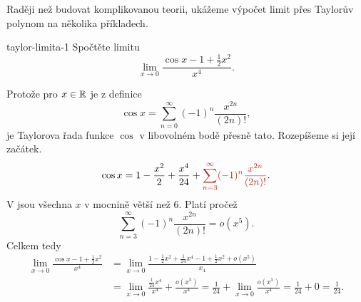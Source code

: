 Raději než budovat komplikovanou teorii, ukážeme výpočet limit přes Taylorův
polynom na několika příkladech.

\begin{problem}{}{taylor-limita-1}
 Spočtěte limitu
 \[
  \lim_{x \to 0} \frac{\cos x - 1 + \frac{1}{2}x^2}{x^{4}}.
 \]
\end{problem}
\begin{probsol}
 Protože pro $x \in \mathbb{R}$ je z definice
 \[
  \cos x = \sum_{n=0}^{\infty} (-1)^{n} \frac{x^{2n}}{(2n)!},
 \]
 je Taylorova řada funkce $\cos$ v libovolném bodě přesně tato. Rozepíšeme si
 její začátek.
 \[
  \cos x = 1 - \frac{x^2}{2} + \frac{x^{4}}{24} + \clr{\sum_{n=3}^{\infty}
  (-1)^{n}\frac{x^{2n}}{(2n)!}}.
 \]
 V  jsou všechna $x$ v mocnině větší než $6$. Platí pročež
 \[
  \sum_{n=3}^{\infty} (-1)^{n}\frac{x^{2n}}{(2n)!} = o(x^{5}).
 \]
 Celkem tedy
 \begin{align*}
  \lim_{x \to 0} \frac{\cos x - 1 + \frac{1}{2}x^2}{x^{4}} &= \lim_{x \to 0}
  \frac{1 - \frac{1}{2}x^2 + \frac{1}{24}x^{4} - 1 + \frac{1}{2}x^2 +
  o(x^{5})}{x_4}\\
                                                           &= \lim_{x \to 0}
                                                 \frac{\frac{1}{24}x^{4}}{x^{4}}
                                                           +
                                                         \frac{o(x^{5})}{x^{4}}
  = \frac{1}{24} + \lim_{x \to 0} \frac{o(x^{5})}{x^{4}} = \frac{1}{24} + 0 =
  \frac{1}{24}.
 \end{align*}
\end{probsol}

